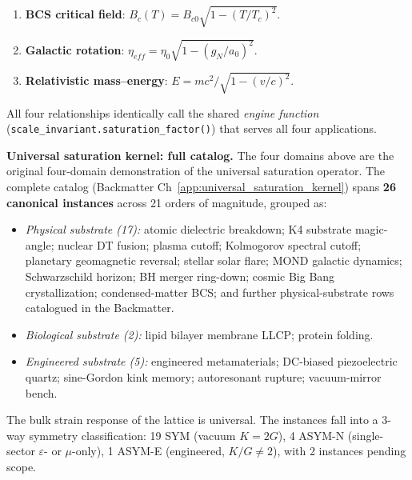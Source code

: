 \begin{enumerate}
    \item \textbf{BCS critical field}: $B_c(T) = B_{c0}\sqrt{1-(T/T_c)^2}$.
    \item \textbf{Galactic rotation}: $\eta_{eff} = \eta_0\sqrt{1-(g_N/a_0)^2}$.
    \item \textbf{Relativistic mass--energy}: $E = mc^2/\sqrt{1-(v/c)^2}$.
\end{enumerate}

All four relationships identically call the shared \textit{engine function}
(\texttt{scale\_invariant.}\allowbreak\texttt{saturation\_factor()}) that serves
all four applications.

\textbf{Universal saturation kernel: full catalog.} The four domains above
are the original four-domain demonstration of the universal saturation
operator. The complete catalog (Backmatter Ch~\ref{app:universal_saturation_kernel})
spans \textbf{26 canonical instances} across 21 orders of magnitude,
grouped as:
\begin{itemize}
    \item \textit{Physical substrate (17):} atomic dielectric breakdown;
    K4 substrate magic-angle; nuclear DT fusion; plasma cutoff;
    Kolmogorov spectral cutoff; planetary geomagnetic reversal; stellar
    solar flare; MOND galactic dynamics; Schwarzschild horizon; BH merger
    ring-down; cosmic Big Bang crystallization; condensed-matter BCS;
    and further physical-substrate rows catalogued in the Backmatter.
    \item \textit{Biological substrate (2):} lipid bilayer membrane LLCP;
    protein folding.
    \item \textit{Engineered substrate (5):} engineered metamaterials;
    DC-biased piezoelectric quartz; sine-Gordon kink memory; autoresonant
    rupture; vacuum-mirror bench.
\end{itemize}
The bulk strain response of the lattice is universal. The instances fall
into a 3-way symmetry classification: 19 SYM (vacuum $K=2G$), 4 ASYM-N
(single-sector $\varepsilon$- or $\mu$-only), 1 ASYM-E (engineered,
$K/G \neq 2$), with 2 instances pending scope.

